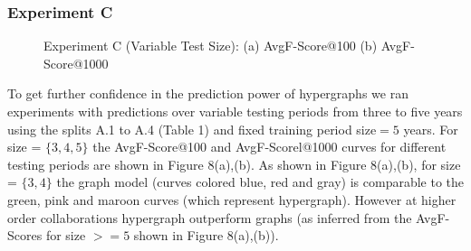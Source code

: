 \documentclass[twoside,leqno,twocolumn]{article}
\begin{document}
\subsubsection{Experiment C}

\begin{figure}
        \centering
        \caption{Experiment C (Variable Test Size): (a) AvgF-Score@100 (b) AvgF-Score@1000}
        \label{fig:EXPB}
\vspace{-1.6em}
\end{figure}

To get further confidence in the prediction power of hypergraphs we ran experiments with predictions over variable testing periods from three to five years using the splits A.1 to A.4 (Table 1) and fixed training period size$=5$ years. For size = $\{3,4,5\}$ the AvgF-Score@100 and AvgF-Scorel@1000 curves for different testing periods are shown in Figure 8(a),(b). As shown in Figure 8(a),(b), for size = $\{3,4\}$ the graph model (curves colored blue, red and gray) is comparable to the green, pink and maroon curves (which represent hypergraph). However at higher order collaborations hypergraph outperform graphs (as inferred from the AvgF-Scores for size $>=5$ shown in Figure 8(a),(b)).


\end{document}
